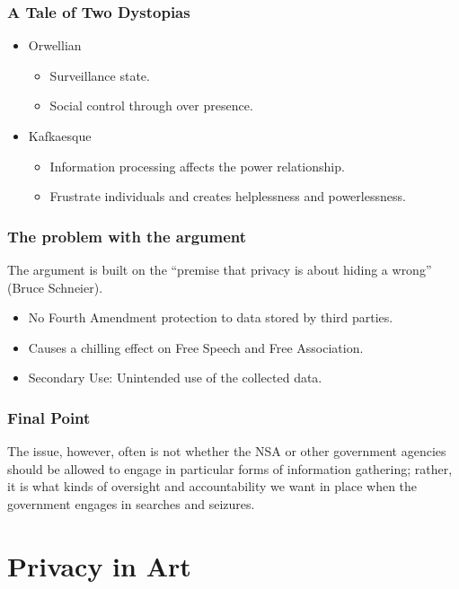 \documentclass{beamer}
\begin{document}
\begin{frame}
\frametitle{A Tale of Two Dystopias}
\begin{itemize}
\item Orwellian
  \begin{itemize}
  \item Surveillance state.
  \item Social control through over presence.
  \end{itemize}
\item Kafkaesque
  \begin{itemize}
  \item Information processing affects the power relationship.
  \item Frustrate individuals and creates helplessness and powerlessness.
  \end{itemize}
\end{itemize}

\end{frame}



\begin{frame}
\frametitle{The problem with the argument}

The argument is built on the ``premise that privacy is about hiding a
wrong'' (Bruce Schneier).

\begin{itemize}
\item No Fourth Amendment protection to data stored by third parties.
\item Causes a chilling effect on Free Speech and Free Association.
\item Secondary Use: Unintended use of the collected data.

\end{itemize}

\end{frame}

\begin{frame}
\frametitle{Final Point}

The issue, however, often is not whether the NSA or other government
agencies should be allowed to engage in particular forms of information
gathering; rather, it is what kinds of oversight and accountability we
want in place when the government engages in searches and seizures.


\end{frame}

\section{Privacy in Art}
\end{document}
